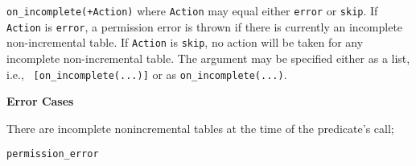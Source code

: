 \begin{description}
\begin{description}
{\bi
\item {\tt on\_incomplete(+Action)} where {\tt Action} may equal
  either {\tt error} or {\tt skip}.  If {\tt Action} is {\tt error}, a
  permission error is thrown if there is currently an incomplete
  non-incremental table.  If {\tt Action} is {\tt skip}, no action
  will be taken for any incomplete non-incremental table.  
\ei 
%
The argument may be specified either as a list, i.e., {\tt
  [on\_incomplete(...)]} or as {\tt on\_incomplete(...)}.
}

{\bf Error Cases}
\bi
\item There are incomplete nonincremental tables at the time of the predicate's call;
\bi
\item 	{\tt permission\_error}
\ei
\ei







\end{description}
\end{description}

